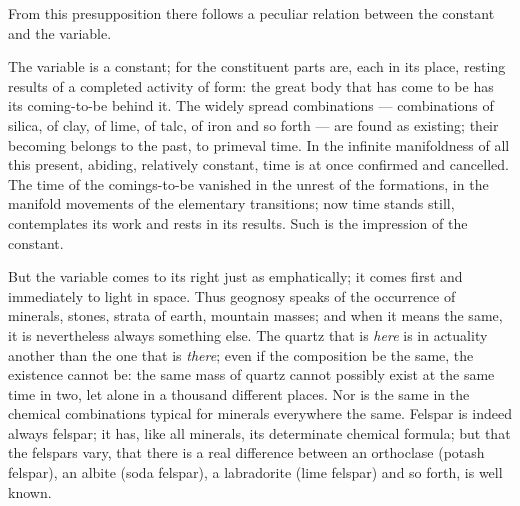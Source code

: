 \documentclass[12pt,a4paper]{book}
\begin{document}
From this presupposition there follows a peculiar relation between the constant and the variable.

The variable is a constant; for the constituent parts are, each in its place, resting results of a completed activity of
form: the great body that has come to be has its coming-to-be behind it.
The widely spread combinations --- combinations of silica, of clay, of lime, of talc, of iron and so forth --- are found
as existing; their becoming belongs to the past, to primeval time. In the infinite manifoldness of all this present,
abiding, relatively constant, time is at once confirmed and cancelled. The time of the comings-to-be vanished in the
unrest of the formations, in the manifold movements of the elementary transitions; now time stands still, contemplates
its work and rests in its results. Such is the impression of the constant.

But the variable comes to its right just as emphatically; it comes first and immediately to light in space. Thus geognosy
speaks of the occurrence of minerals, stones, strata of earth, mountain masses; and
when it means the same, it is nevertheless always something else. The quartz that is \emph{here} is in actuality another
than the one that is \emph{there}; even if the composition be the same, the existence cannot be: the same mass of quartz
cannot possibly exist at the same time in two, let alone in a thousand different places. Nor is the same in the chemical
combinations typical for minerals everywhere the same. Felspar is indeed always felspar; it has, like all minerals, its
determinate chemical formula; but that the felspars vary, that there is a real difference between an orthoclase (potash
felspar), an albite (soda felspar), a labradorite (lime felspar) and so forth, is well known.
\end{document}

